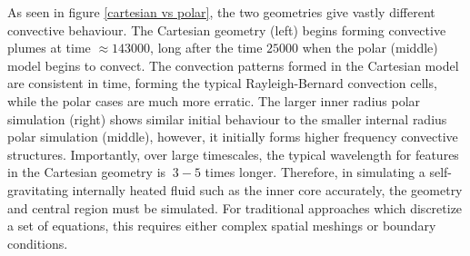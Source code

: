 \documentclass{article}
\begin{document}
\noindent As seen in figure \ref{cartesian vs polar}, the two geometries give vastly different convective behaviour. The Cartesian geometry (left) begins forming 
convective plumes at time $\approx 143000$, long after the time $25000$ when the polar (middle) model begins to convect. The convection patterns formed 
in the Cartesian model are consistent in time, forming the typical Rayleigh-Bernard convection cells, while the polar cases are much more erratic. The larger inner radius polar simulation (right) shows similar initial behaviour to the smaller internal radius polar simulation (middle), however, it initially forms higher frequency convective structures. Importantly, over large timescales, the typical wavelength for features in the Cartesian geometry is $~3-5$ times longer. Therefore, in simulating a self-gravitating internally heated fluid such as the inner core accurately, the geometry and central region must be simulated. For traditional approaches which discretize a set of equations, this requires either complex spatial meshings or boundary conditions. 
\end{document}
